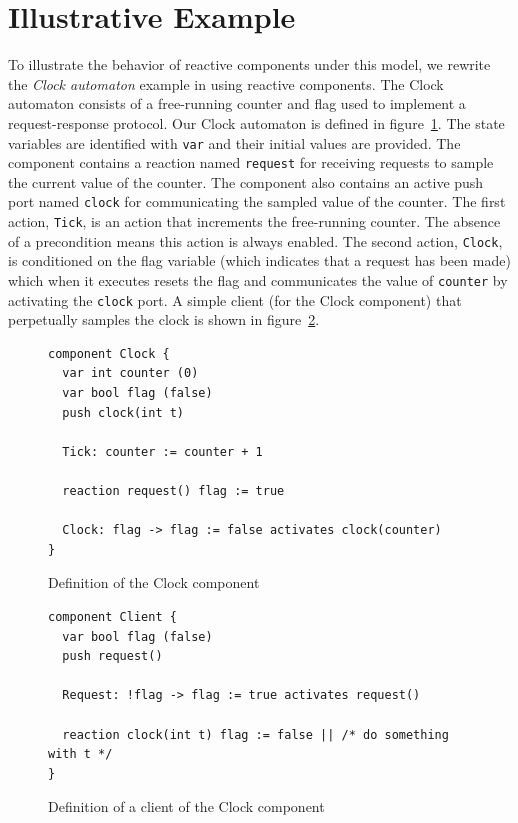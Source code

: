 \section{Illustrative Example}
To illustrate the behavior of reactive components under this model, we rewrite the \emph{Clock automaton} example in \cite{nancy1996distributed} using reactive components.
The Clock automaton consists of a free-running counter and flag used to implement a request-response protocol.
Our Clock automaton is defined in figure~\ref{clock_component}.
The state variables are identified with \verb+var+ and their initial values are provided.
The component contains a reaction named \verb+request+ for receiving requests to sample the current value of the counter.
The component also contains an active push port named \verb+clock+ for communicating the sampled value of the counter.
The first action, \verb+Tick+, is an action that increments the free-running counter.
The absence of a precondition means this action is always enabled.
The second action, \verb+Clock+, is conditioned on the flag variable (which indicates that a request has been made) which when it executes resets the flag and communicates the value of \verb+counter+ by activating the \verb+clock+ port.
A simple client (for the Clock component) that perpetually samples the clock is shown in figure~\ref{client_component}.

\begin{figure}
\begin{verbatim}
component Clock {
  var int counter (0)
  var bool flag (false)
  push clock(int t)

  Tick: counter := counter + 1

  reaction request() flag := true

  Clock: flag -> flag := false activates clock(counter)
}
\end{verbatim}
\caption{Definition of the Clock component\label{clock_component}}
\end{figure}

\begin{figure}
\begin{verbatim}
component Client {
  var bool flag (false)
  push request()

  Request: !flag -> flag := true activates request()

  reaction clock(int t) flag := false || /* do something with t */
}
\end{verbatim}
\caption{Definition of a client of the Clock component\label{client_component}}
\end{figure}

